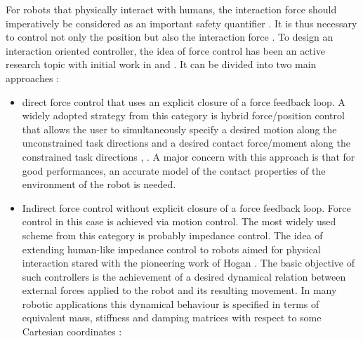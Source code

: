 For robots that physically interact with humans, the interaction force should imperatively be considered as an important safety quantifier \cite{ISO15066PDF}. It is thus necessary to control not only the position but also the interaction force \cite{ikuta2001safety}. To design an interaction oriented controller, the idea of force control has been an active research topic with initial work in \cite{whitney1977force} and \cite{mason1981compliance}. It can be divided into two main approaches \cite[Chapter~9]{siciliano2016springer}: 
\begin{itemize}
\item direct force control that uses an explicit closure of a force feedback loop. A widely adopted strategy from this category is hybrid force/position control that allows the user to simultaneously specify a desired motion along the unconstrained task directions and a desired contact force/moment along the constrained task directions \cite{raibert1981hybrid}, \cite{khatib1987unified}. A major concern with this approach is that for good performances, an accurate model of the contact properties of the environment of the robot is needed.
\item Indirect force control without explicit closure of a force feedback loop. Force control in this case is achieved via motion control. The most widely used scheme from this category is probably impedance control. The idea of extending human-like impedance control to robots aimed for physical interaction stared with the pioneering work of Hogan \cite{hogan1984impedance}. The basic objective of such controllers is the achievement of a desired dynamical relation between external forces applied to the robot and its resulting movement. In many robotic  applications this dynamical behaviour is specified in terms  of equivalent mass, stiffness and damping matrices with respect to some Cartesian coordinates \cite{ott2010unified}:

\end{itemize}
